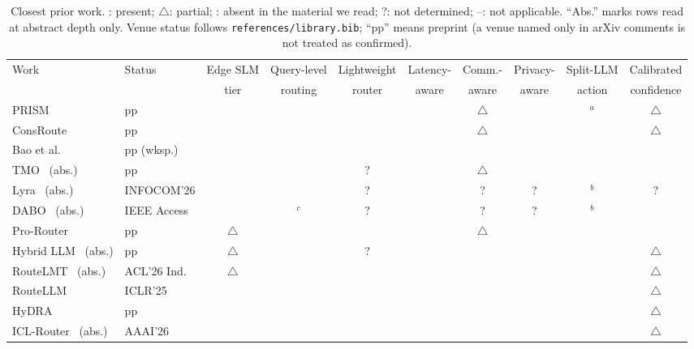 \documentclass[lettersize,journal]{IEEEtran}
\newcommand{\cmark}{\ding{51}}
\newcommand{\xmark}{\ding{55}}
\newcommand{\pmark}{$\triangle$}
\begin{document}
\begin{table}[t]
\centering
\caption{Closest prior work. \cmark: present; \pmark: partial; \xmark: absent
in the material we read; ?: not determined; --: not applicable. ``Abs.'' marks
rows read at abstract depth only. Venue status follows
\texttt{references/library.bib}; ``pp'' means preprint (a venue named only in
arXiv comments is not treated as confirmed).}
\label{tab:comparison}
\scriptsize
\setlength{\tabcolsep}{3pt}
\begin{tabular}{llcccccccc}
\hline
Work & Status & Edge SLM & Query-level & Lightweight & Latency- & Comm.- & Privacy- & Split-LLM & Calibrated \\
 & & tier & routing & router & aware & aware & aware & action & confidence \\
\hline
PRISM~\cite{zhan2025prism} & pp & \cmark & \cmark & \cmark & \cmark & \pmark & \cmark & \xmark$^a$ & \pmark \\
ConsRoute~\cite{qiao2026consroute} & pp & \cmark & \cmark & \cmark & \cmark & \pmark & \xmark & \xmark & \pmark \\
Bao et al.~\cite{bao2025dynamic} & pp (wksp.) & \cmark & \cmark & \cmark & \cmark & \cmark & \xmark & \xmark & \xmark \\
TMO~\cite{yuan2025device} (abs.) & pp & \cmark & \cmark & ? & \cmark & \pmark & \xmark & \xmark & \xmark \\
Lyra~\cite{ma2026preference} (abs.) & INFOCOM'26 & \cmark & \cmark & ? & \cmark & ? & ? & \xmark$^b$ & ? \\
DABO~\cite{zhu2026dabo} (abs.) & IEEE Access & \cmark & \cmark$^c$ & ? & \cmark & ? & ? & \xmark$^b$ & \cmark \\
Pro-Router~\cite{gui2026pro} & pp & \pmark & \cmark & \cmark & \cmark & \pmark & \xmark & \xmark & \cmark \\
Hybrid LLM~\cite{ding2024hybrid} (abs.) & pp & \pmark & \cmark & ? & \xmark & \xmark & \xmark & \xmark & \pmark \\
RouteLMT~\cite{luo2026routelmt} (abs.) & ACL'26 Ind. & \pmark & \cmark & \cmark & \xmark & \xmark & \xmark & \xmark & \pmark \\
RouteLLM~\cite{ong2025routellm} & ICLR'25 & \xmark & \cmark & \cmark & \xmark & \xmark & \xmark & \xmark & \pmark \\
HyDRA~\cite{garg2026hydra} & pp & \xmark & \cmark & \cmark & \cmark & \xmark & \xmark & \xmark & \pmark \\
ICL-Router~\cite{wang2026icl} (abs.) & AAAI'26 & \xmark & \cmark & \xmark & \xmark & \xmark & \xmark & \xmark & \pmark \\

\end{tabular}
\end{table}
\end{document}
